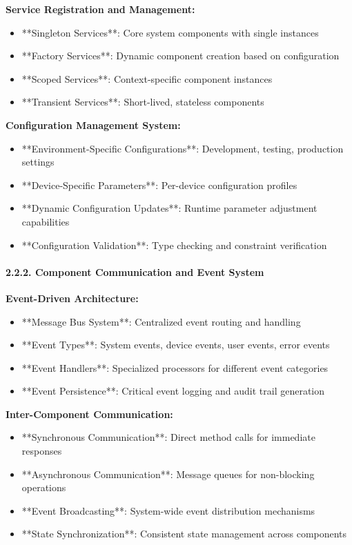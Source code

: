 \documentclass[11pt,a4paper]{article}
\begin{document}
\textbf{Service Registration and Management:}

\begin{itemize}
\item **Singleton Services**: Core system components with single instances
\item **Factory Services**: Dynamic component creation based on configuration
\item **Scoped Services**: Context-specific component instances
\item **Transient Services**: Short-lived, stateless components

\end{itemize}
\textbf{Configuration Management System:}

\begin{itemize}
\item **Environment-Specific Configurations**: Development, testing, production settings
\item **Device-Specific Parameters**: Per-device configuration profiles
\item **Dynamic Configuration Updates**: Runtime parameter adjustment capabilities
\item **Configuration Validation**: Type checking and constraint verification

\end{itemize}
\paragraph{2.2.2. Component Communication and Event System}

\textbf{Event-Driven Architecture:}

\begin{itemize}
\item **Message Bus System**: Centralized event routing and handling
\item **Event Types**: System events, device events, user events, error events
\item **Event Handlers**: Specialized processors for different event categories
\item **Event Persistence**: Critical event logging and audit trail generation

\end{itemize}
\textbf{Inter-Component Communication:}

\begin{itemize}
\item **Synchronous Communication**: Direct method calls for immediate responses
\item **Asynchronous Communication**: Message queues for non-blocking operations
\item **Event Broadcasting**: System-wide event distribution mechanisms
\item **State Synchronization**: Consistent state management across components

\end{itemize}
\end{document}
